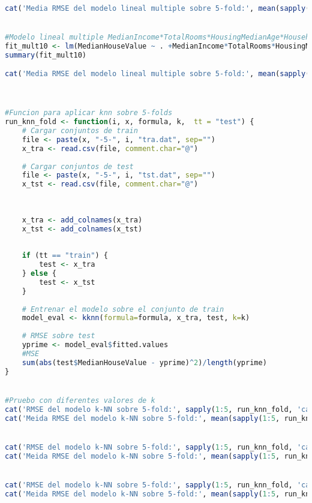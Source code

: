 \begin{lstlisting}[language=R]
cat('Media RMSE del modelo lineal multiple sobre 5-fold:', mean(sapply(1:5, run_lm_fold, 'california', fit_mult9), fill=T))


#Modelo lineal multiple MedianIncome*TotalRooms*HousingMedianAge*Households 
fit_mult10 <- lm(MedianHouseValue ~ . +MedianIncome*TotalRooms*HousingMedianAge*Households , data=df_california)
summary(fit_mult10)

cat('Media RMSE del modelo lineal multiple sobre 5-fold:', mean(sapply(1:5, run_lm_fold, 'california', fit_mult10), fill=T))



#Funcion para aplicar knn sobre 5-folds
run_knn_fold <- function(i, x, formula, k,  tt = "test") {
	# Cargar conjuntos de train
	file <- paste(x, "-5-", i, "tra.dat", sep="")
	x_tra <- read.csv(file, comment.char="@")
	
	# Cargar conjuntos de test
	file <- paste(x, "-5-", i, "tst.dat", sep="")
	x_tst <- read.csv(file, comment.char="@")
	
	
	
	x_tra <- add_colnames(x_tra)
	x_tst <- add_colnames(x_tst)
	
	
	if (tt == "train") {
		test <- x_tra
	} else {
		test <- x_tst
	}
	
	# Entrenar el modelo sobre el conjunto de train
	model_eval <- kknn(formula=formula, x_tra, test, k=k)
	
	# RMSE sobre test
	yprime <- model_eval$fitted.values
	#MSE
	sum(abs(test$MedianHouseValue - yprime)^2)/length(yprime) 
}


#Pruebo con diferentes valores de k
cat('RMSE del modelo k-NN sobre 5-fold:', sapply(1:5, run_knn_fold, 'california', MedianHouseValue ~ . +MedianIncome*TotalRooms*HousingMedianAge*Households, k = 5), fill=T)
cat('Meida RMSE del modelo k-NN sobre 5-fold:', mean(sapply(1:5, run_knn_fold, 'california', MedianHouseValue ~ . +MedianIncome*TotalRooms*HousingMedianAge*Households, k = 5), fill=T))


cat('RMSE del modelo k-NN sobre 5-fold:', sapply(1:5, run_knn_fold, 'california', MedianHouseValue ~ . +MedianIncome*TotalRooms*HousingMedianAge*Households, k = 7), fill=T)
cat('Meida RMSE del modelo k-NN sobre 5-fold:', mean(sapply(1:5, run_knn_fold, 'california', MedianHouseValue ~ . +MedianIncome*TotalRooms*HousingMedianAge*Households, k = 7), fill=T))


cat('RMSE del modelo k-NN sobre 5-fold:', sapply(1:5, run_knn_fold, 'california', MedianHouseValue ~ . +MedianIncome*TotalRooms*HousingMedianAge*Households, k = 10), fill=T)
cat('Meida RMSE del modelo k-NN sobre 5-fold:', mean(sapply(1:5, run_knn_fold, 'california', MedianHouseValue ~ . +MedianIncome*TotalRooms*HousingMedianAge*Households, k = 10), fill=T))



\end{lstlisting}
